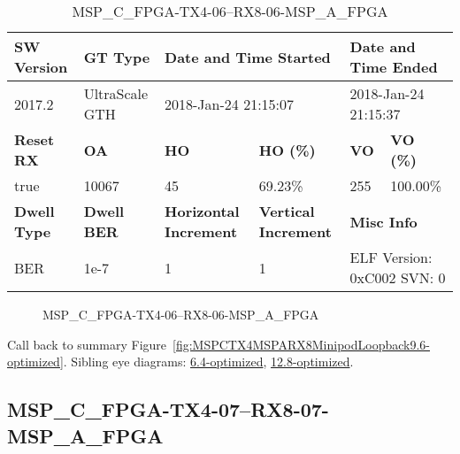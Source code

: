 \begin{table}[h]
\centering
\caption{MSP\_C\_FPGA-TX4-06--RX8-06-MSP\_A\_FPGA}
\label{tab:MSPCFPGATX406RX806MSPAFPGA9.6-optimized}
\begin{tabular}{@{}|l|l|l|l|l|l|@{}}
\toprule
\textbf{SW Version}                & \textbf{GT Type}   & \multicolumn{2}{l|}{\textbf{Date and Time Started}}            & \multicolumn{2}{l|}{\textbf{Date and Time Ended}}        \\ \midrule
2017.2                       & UltraScale GTH          & \multicolumn{2}{l|}{2018-Jan-24 21:15:07}                   & \multicolumn{2}{l|}{2018-Jan-24 21:15:37}               \\ \midrule
\textbf{Reset RX}                  & \textbf{OA} & \textbf{HO}   & \textbf{HO (\%)} & \textbf{VO} & \textbf{VO (\%)} \\ \midrule
true & 10067        & 45          & 69.23\%        & 255        & 100.00\%       \\ \midrule
\textbf{Dwell Type}                & \textbf{Dwell BER} & \textbf{Horizontal Increment} & \textbf{Vertical Increment}    & \multicolumn{2}{l|}{\textbf{Misc Info}}                  \\ \midrule
BER                            & 1e-7        & 1        & 1           & \multicolumn{2}{l|}{ELF Version: 0xC002 SVN: 0}                         \\ \bottomrule
\end{tabular}
\end{table}

\begin{figure}[h]
\caption{MSP\_C\_FPGA-TX4-06--RX8-06-MSP\_A\_FPGA} \label{fig:MSPCFPGATX406RX806MSPAFPGA9.6-optimized}
\end{figure}

Call back to summary Figure~\ref{fig:MSPCTX4MSPARX8MinipodLoopback9.6-optimized}.
Sibling eye diagrams: \hyperref[sec:MSPCFPGATX406RX806MSPAFPGA6.4-optimized]{6.4-optimized}, \hyperref[sec:MSPCFPGATX406RX806MSPAFPGA12.8-optimized]{12.8-optimized}.

\clearpage
\newpage


\subsection{MSP\_C\_FPGA-TX4-07--RX8-07-MSP\_A\_FPGA}\label{sec:MSPCFPGATX407RX807MSPAFPGA9.6-optimized}

